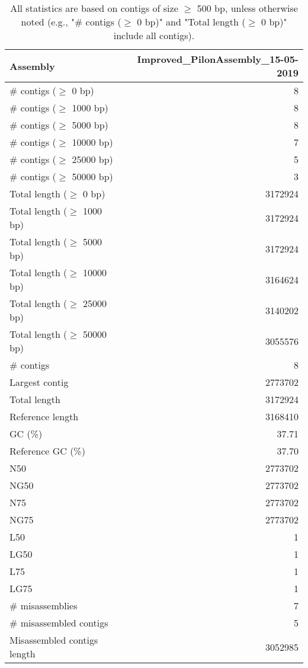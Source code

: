\documentclass[12pt,a4paper]{article}
\begin{document}
\begin{table}[ht]
\begin{center}
\caption{All statistics are based on contigs of size $\geq$ 500 bp, unless otherwise noted (e.g., "\# contigs ($\geq$ 0 bp)" and "Total length ($\geq$ 0 bp)" include all contigs).}
\begin{tabular}{|l*{1}{|r}|}
\hline
Assembly & Improved\_PilonAssembly\_15-05-2019 \\ \hline
\# contigs ($\geq$ 0 bp) & 8 \\ \hline
\# contigs ($\geq$ 1000 bp) & 8 \\ \hline
\# contigs ($\geq$ 5000 bp) & 8 \\ \hline
\# contigs ($\geq$ 10000 bp) & 7 \\ \hline
\# contigs ($\geq$ 25000 bp) & 5 \\ \hline
\# contigs ($\geq$ 50000 bp) & 3 \\ \hline
Total length ($\geq$ 0 bp) & 3172924 \\ \hline
Total length ($\geq$ 1000 bp) & 3172924 \\ \hline
Total length ($\geq$ 5000 bp) & 3172924 \\ \hline
Total length ($\geq$ 10000 bp) & 3164624 \\ \hline
Total length ($\geq$ 25000 bp) & 3140202 \\ \hline
Total length ($\geq$ 50000 bp) & 3055576 \\ \hline
\# contigs & 8 \\ \hline
Largest contig & 2773702 \\ \hline
Total length & 3172924 \\ \hline
Reference length & 3168410 \\ \hline
GC (\%) & 37.71 \\ \hline
Reference GC (\%) & 37.70 \\ \hline
N50 & 2773702 \\ \hline
NG50 & 2773702 \\ \hline
N75 & 2773702 \\ \hline
NG75 & 2773702 \\ \hline
L50 & 1 \\ \hline
LG50 & 1 \\ \hline
L75 & 1 \\ \hline
LG75 & 1 \\ \hline
\# misassemblies & 7 \\ \hline
\# misassembled contigs & 5 \\ \hline
Misassembled contigs length & 3052985 \\ \hline

\end{tabular}
\end{center}
\end{table}
\end{document}
